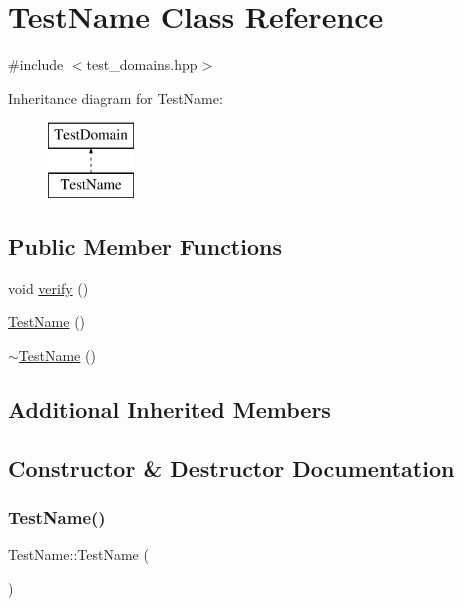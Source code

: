 \hypertarget{class_test_name}{}\section{Test\+Name Class Reference}
\label{class_test_name}


{\ttfamily \#include $<$test\+\_\+domains.\+hpp$>$}

Inheritance diagram for Test\+Name\+:\begin{figure}[H]
\begin{center}
\leavevmode
\includegraphics[height=2.000000cm]{class_test_name}
\end{center}
\end{figure}
\subsection*{Public Member Functions}
\begin{DoxyCompactItemize}
\item 
void \hyperlink{class_test_name_a578481758db2b6506d86ea8208208cfe}{verify} ()
\item 
\hyperlink{class_test_name_aebe1cb3955150d92fce4a8abec1b0d86}{Test\+Name} ()
\item 
\hyperlink{class_test_name_afc5241e6c7d586d2bc8f4d56e86431e8}{$\sim$\+Test\+Name} ()
\end{DoxyCompactItemize}
\subsection*{Additional Inherited Members}


\subsection{Constructor \& Destructor Documentation}
\mbox{\label{class_test_name_aebe1cb3955150d92fce4a8abec1b0d86}} 
\subsubsection{\texorpdfstring{Test\+Name()}{TestName()}}
{\footnotesize\ttfamily Test\+Name\+::\+Test\+Name (\begin{DoxyParamCaption}{ }\end{DoxyParamCaption})}

